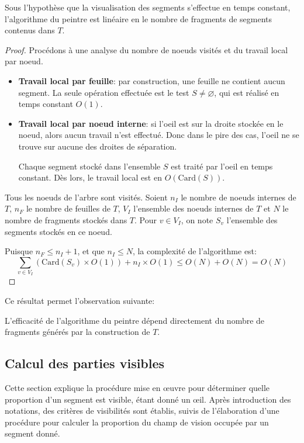 \begin{prop}\label{compl:painter}
  Sous l'hypothèse que la visualisation des segments s'effectue
  en temps constant, l'algorithme du peintre est linéaire en le
  nombre de fragments de segments contenus dans $T$.
\end{prop}
\begin{proof}
  Procédons à une analyse du nombre de noeuds visités et du travail local
  par noeud.
  \begin{itemize}
  \item \textbf{Travail local par feuille}: par construction, une feuille
    ne contient aucun segment. La seule opération effectuée est le test
    $S\neq \varnothing$, qui est réalisé en temps constant $O(1)$.
  \item \textbf{Travail local par noeud interne}: si l'oeil est sur la droite
    stockée en le noeud, alors aucun travail n'est effectué. Donc dans le
    pire des cas, l'oeil ne se trouve sur aucune des droites de séparation.

    Chaque segment stocké dans l'ensemble $S$ est traité par l'oeil en
    temps constant. Dès lors, le travail local est en $O(\mathrm{Card}(S))$.
  \end{itemize}
  Tous les noeuds de l'arbre sont visités. Soient $n_I$ le nombre de noeuds
  internes de $T$, $n_F$ le nombre de feuilles de $T$, $V_I$ l'ensemble des
  noeuds internes de $T$ et $N$ le nombre
  de fragments stockés dans $T$.
  Pour $v\in V_I$, on note $S_v$ l'ensemble des segments stockés en ce noeud.

  Puisque $n_F \leq n_I + 1$, et que $n_I\leq N$,
  la complexité de l'algorithme est:
  $$ \sum_{v\in V_I}\left(\mathrm{Card}(S_v)\times O(1)\right) +
  n_I \times O(1) \leq O(N) + O(N) = O(N)$$
\end{proof}

Ce résultat permet l'observation suivante:
\begin{cor}\label{peintre:cor}
  L'efficacité de l'algorithme du peintre dépend directement
  du nombre de fragments générés par la construction de $T$.
\end{cor}
\subsection{Calcul des parties visibles}\label{not:oeil}
Cette section explique la procédure mise en \oe{}uvre pour déterminer
quelle proportion d'un segment est visible, étant donné un \oe{}il.
Après introduction des notations, des critères de visibilités sont
établis, suivis de l'élaboration d'une procédure pour calculer la
proportion du champ de vision occupée par un segment donné.

